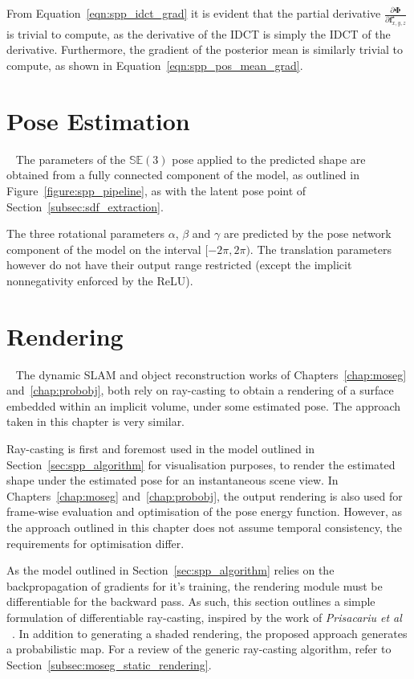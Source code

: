 From Equation~\ref{eqn:spp_idct_grad} it is evident that the partial derivative 
\( \frac{\partial \bm{\Phi}}{\partial \bm{f}_{x, y, z}^{\star}} \) is trivial 
to compute, as the derivative of the IDCT is simply the IDCT of the derivative. 
Furthermore, the gradient of the posterior mean is similarly trivial to compute, as shown 
in Equation~\ref{eqn:spp_pos_mean_grad}.

\section{Pose Estimation}
~\label{sec:spp_pose_estim}
The parameters of the \( \mathbb{SE}(3) \) pose applied to the predicted shape are obtained 
from a fully connected component of the model, as outlined in Figure~\ref{figure:spp_pipeline}, as with the 
latent pose point of Section~\ref{subsec:sdf_extraction}.

The three rotational parameters \( \alpha \), \( \beta \) and \( \gamma \) are predicted by 
the pose network component of the model on the interval \( [-2\pi, 2\pi) \). The translation parameters 
however do not have their output range restricted (except the implicit nonnegativity enforced by the ReLU).

\section{Rendering}
~\label{sec:spp_rendering}
The dynamic SLAM and object reconstruction works of Chapters~\ref{chap:moseg} and~\ref{chap:probobj}, 
both rely on ray-casting to obtain a rendering of a surface embedded within an implicit volume, under 
some estimated pose. The approach taken in this chapter is very similar. 

Ray-casting is first and foremost used in the model outlined in Section~\ref{sec:spp_algorithm} for 
visualisation purposes, to render the estimated shape under the estimated pose for an instantaneous scene 
view. In Chapters~\ref{chap:moseg} and~\ref{chap:probobj}, the output rendering is also used for frame-wise 
evaluation and optimisation of the pose energy function. However, as the approach outlined in this chapter 
does not assume temporal consistency, the requirements for optimisation differ.

As the model outlined in Section~\ref{sec:spp_algorithm} relies on the backpropagation of gradients for it's 
training, the rendering module must be differentiable for the backward pass. As such, this section outlines a 
simple formulation of differentiable ray-casting, inspired by the work of \textit{Prisacariu et al}
~\cite{Prisacariu2011}. In addition to generating a shaded rendering, the proposed approach generates a 
probabilistic map. For a review of the generic ray-casting algorithm, refer to Section~\ref{subsec:moseg_static_rendering}.


